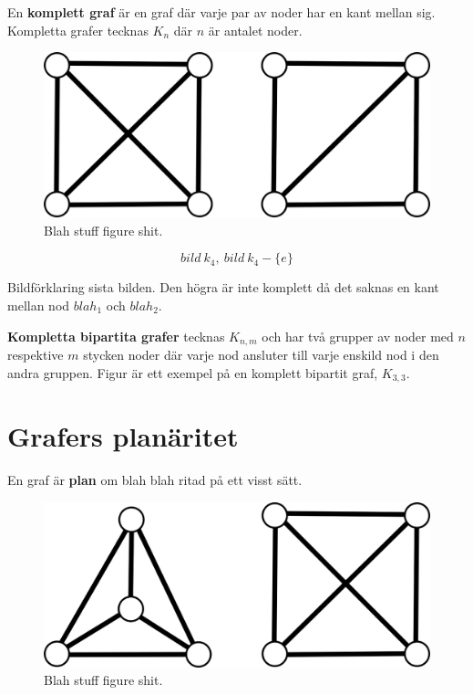 \documentclass[a4paper,11pt]{article}
\begin{document}
En \textbf{komplett graf} är en graf där varje par av noder har en kant mellan sig. Kompletta grafer tecknas $K_n$ där $n$ är antalet noder.

\begin{figure}[!ht]
	\begin{center}
		\includegraphics{fig3}
		\caption{Blah stuff figure shit.}
		\label{fig3}
	\end{center}
\end{figure}
\FloatBarrier

$$bild\ k_4,\ bild\ k_4-\{e\}$$

Bildförklaring sista bilden. Den högra är inte komplett då det saknas en kant mellan nod $blah_1$ och $blah_2$.

\textbf{Kompletta bipartita grafer} tecknas $K_{n,m}$ och har två grupper av noder med $n$ respektive $m$ stycken noder där varje nod ansluter till varje enskild nod i den andra gruppen. Figur \cite{fig2} är ett exempel på en komplett bipartit graf, $K_{3,3}$.

\section*{Grafers planäritet}

En graf är \textbf{plan} om blah blah ritad på ett visst sätt.

\begin{figure}[!ht]
	\begin{center}
		\includegraphics{fig4}
		\caption{Blah stuff figure shit.}
		\label{fig4}
	\end{center}
\end{figure}
\FloatBarrier
\end{document}
